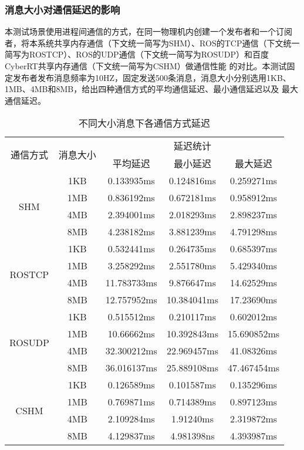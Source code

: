 \subsubsection{消息大小对通信延迟的影响}
本测试场景使用进程间通信的方式，在同一物理机内创建一个发布者和一个订阅者，将本系统共享内存通信（下文统一简写为SHM）、ROS的TCP通信（下文统一简写为ROSTCP）、ROS的UDP通信（下文统一简写为ROSUDP）和百度CyberRT共享内存通信（下文统一简写为CSHM）做通信性能
的对比。本测试固定发布者发布消息频率为10HZ，固定发送500条消息，消息大小分别选用1KB、1MB、4MB和8MB，给出四种通信方式的平均通信延迟、最小通信延迟以及
最大通信延迟。
\begin{table}[htb]
  \centering\small
  \caption{不同大小消息下各通信方式延迟}
  \renewcommand\arraystretch{1.2}
  \label{one_to_one}
  \begin{tabular}{ccccc}
    \toprule
    \multirow{2}{*}{通信方式} & \multirow{2}{*}{消息大小} & \multicolumn{3}{c}{延迟统计}\\
     & & 平均延迟 & 最小延迟 & 最大延迟\\
    \midrule
    \multirow{4}{*}{SHM} & 1KB& 0.133935ms& 0.124816ms& 0.259271ms\\ & 1MB & 0.836192ms & 0.672181ms & 0.958912ms \\ & 4MB & 2.394001ms & 2.018293ms & 2.898237ms \\ & 8MB & 4.238182ms & 3.881239ms & 4.791298ms\\
    \hline
    \multirow{4}{*}{ROSTCP} & 1KB& 0.532441ms& 0.264735ms& 0.685397ms\\ & 1MB & 3.258292ms & 2.551780ms & 5.429340ms \\ & 4MB & 11.783733ms & 9.876647ms & 14.62529ms \\ & 8MB & 12.757952ms & 10.384041ms & 17.23690ms\\
    \hline
    \multirow{4}{*}{ROSUDP} & 1KB& 0.515512ms& 0.210117ms& 0.602012ms\\ & 1MB & 10.66662ms & 10.392843ms & 15.690852ms \\ & 4MB & 32.300212ms & 22.969457ms & 41.08326ms \\ & 8MB & 36.016137ms & 25.889108ms & 47.467454ms\\
    \hline
    \multirow{4}{*}{CSHM} & 1KB& 0.126589ms& 0.101587ms& 0.135296ms\\ & 1MB & 0.769871ms & 0.714389ms & 0.897123ms \\ & 4MB & 2.109284ms & 1.91240ms & 2.319872ms \\ & 8MB & 4.129837ms & 4.981398ns & 4.393987ms\\
    \bottomrule
  \end{tabular}
\end{table}

